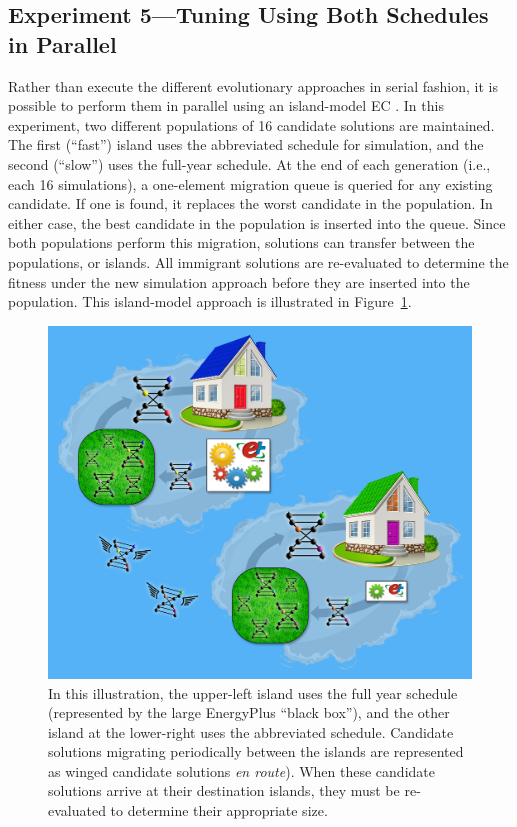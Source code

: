 \documentclass[preprint, review, 12pt]{elsarticle}
\begin{document}
\subsection{Experiment 5---Tuning Using Both Schedules in Parallel}
\label{sub:experiment5}
Rather than execute the different evolutionary approaches in serial fashion, it is possible to perform them in parallel using an island-model EC \cite{cit:eiben2007}. In this experiment, two different populations of 16 candidate solutions are maintained. The first (``fast'') island uses the abbreviated schedule for simulation, and the second (``slow'') uses the full-year schedule. At the end of each generation (i.e., each 16 simulations), a one-element migration queue is queried for any existing candidate. If one is found, it replaces the worst candidate in the population. In either case, the best candidate in the population is inserted into the queue. Since both populations perform this migration, solutions can transfer between the populations, or islands. All immigrant solutions are re-evaluated to determine the fitness under the new simulation approach before they are inserted into the population. This island-model approach is illustrated in Figure~\ref{fig:islands}.

\begin{figure}[htbp]
\centering
\includegraphics[width=5in]{graphics/autotune_islands}
\caption{In this illustration, the upper-left island uses the full year schedule (represented by the large EnergyPlus ``black box''), and the other island at the lower-right uses the abbreviated schedule. Candidate solutions migrating periodically between the islands are represented as winged candidate solutions \emph{en route}). When these candidate solutions arrive at their destination islands, they must be re-evaluated to determine their appropriate size.}
\label{fig:islands}
\end{figure}
\end{document}
